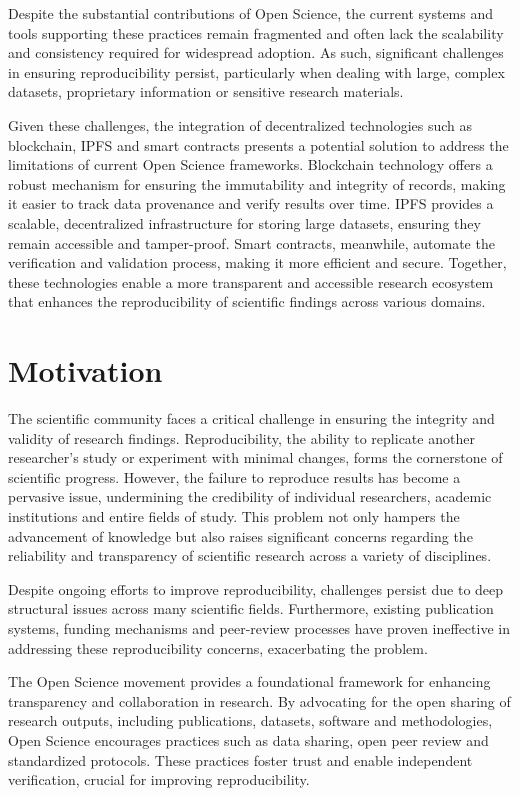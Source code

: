 \documentclass{article}
\begin{document}
Despite the substantial contributions of Open Science, the current systems and tools supporting these practices remain fragmented and often lack the scalability and consistency required for widespread adoption. As such, significant challenges in ensuring reproducibility persist, particularly when dealing with large, complex datasets, proprietary information  or sensitive research materials.

Given these challenges, the integration of decentralized technologies such as blockchain, IPFS and smart contracts presents a potential solution to address the limitations of current Open Science frameworks. Blockchain technology offers a robust mechanism for ensuring the immutability and integrity of records, making it easier to track data provenance and verify results over time. IPFS provides a scalable, decentralized infrastructure for storing large datasets, ensuring they remain accessible and tamper-proof. Smart contracts, meanwhile, automate the verification and validation process, making it more efficient and secure. Together, these technologies enable a more transparent and accessible research ecosystem that enhances the reproducibility of scientific findings across various domains.

\section{Motivation}

The scientific community faces a critical challenge in ensuring the integrity and validity of research findings. Reproducibility, the ability to replicate another researcher's study or experiment with minimal changes, forms the cornerstone of scientific progress. However, the failure to reproduce results has become a pervasive issue, undermining the credibility of individual researchers, academic institutions and entire fields of study. This problem not only hampers the advancement of knowledge but also raises significant concerns regarding the reliability and transparency of scientific research across a variety of disciplines.

Despite ongoing efforts to improve reproducibility, challenges persist due to deep structural issues across many scientific fields. Furthermore, existing publication systems, funding mechanisms and peer-review processes have proven ineffective in addressing these reproducibility concerns, exacerbating the problem.

The Open Science movement provides a foundational framework for enhancing transparency and collaboration in research. By advocating for the open sharing of research outputs, including publications, datasets, software and methodologies, Open Science encourages practices such as data sharing, open peer review and standardized protocols. These practices foster trust and enable independent verification, crucial for improving reproducibility.
\end{document}
